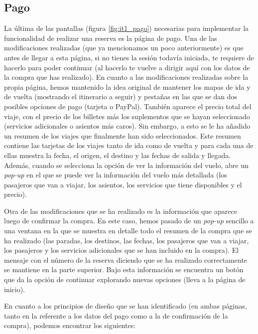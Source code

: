 \subsection{Pago}

La última de las pantallas (figura \ref{fig:it1_pago}) necesarias para implementar la funcionalidad de realizar una reserva es la página de
pago. Una de las modificaciones realizadas (que ya mencionamos un poco anteriormente) es que antes de llegar a
esta página, si no tienes la sesión todavía iniciada, te requiere de hacerlo para poder continuar (al hacerlo te
vuelve a dirigir aquí con los datos de la compra que has realizado). En cuanto a las modificaciones realizadas
sobre la propia página, hemos mantenido la idea original de mantener los mapas de ida y de vuelta (mostrando el
itinerario a seguir) y pestañas en las que se dan dos posibles opciones de pago (tarjeta o PayPal). También
aparece el precio total del viaje, con el precio de los billetes más los suplementos que se hayan seleccionado
(servicios adicionales o asientos más caros). Sin embargo, a esto se le ha añadido un resumen de los viajes que
finalmente han sido seleccionados. Este resumen contiene las tarjetas de los viajes tanto de ida como de vuelta
y para cada una de ellas muestra la fecha, el origen, el destino y las fechas de salida y llegada. Además, cuando
se selecciona la opción de ver la información del vuelo, abre un \textit{pop-up} en el que se puede ver la información del
vuelo más detallada (los pasajeros que van a viajar, los asientos, los servicios que tiene disponibles y el precio). 

Otra de las modificaciones que se ha realizado es la información que aparece luego de confirmar la compra. En este
caso, hemos pasado de un \textit{pop-up} sencillo a una ventana en la que se muestra en detalle todo el resumen de la compra
que se ha realizado (las paradas, los destinos, las fechas, los pasajeros que van a viajar, los pasajeros y los
servicios adicionales que se han incluido en la compra). El mensaje con el número de la reserva diciendo que se ha
realizado correctamente se mantiene en la parte superior. Bajo esta información se encuentra un botón que da la
opción de continuar explorando nuevas opciones (lleva a la página de inicio). 

En cuanto a los principios de diseño que se han identificado (en ambas páginas, tanto en la referente a los datos
del pago como a la de confirmación de la compra), podemos encontrar los siguientes:

